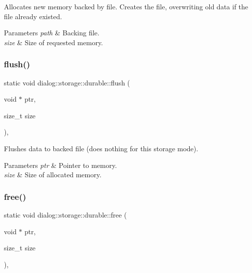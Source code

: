 Allocates new memory backed by file. Creates the file, overwriting old data if the file already existed.


\begin{DoxyParams}{Parameters}
{\em path} & Backing file. \\
\hline
{\em size} & Size of requested memory. \\
\hline
\end{DoxyParams}
\mbox{\label{structdialog_1_1storage_1_1durable_a1ea22279109b5b06d195aadfe5594ef4}} 
\subsubsection{\texorpdfstring{flush()}{flush()}}
{\footnotesize\ttfamily static void dialog\+::storage\+::durable\+::flush (\begin{DoxyParamCaption}\item[{void $\ast$}]{ptr,  }\item[{size\+\_\+t}]{size }\end{DoxyParamCaption})\hspace{0.3cm}{\ttfamily [inline]}, {\ttfamily [static]}}

Flushes data to backed file (does nothing for this storage mode).


\begin{DoxyParams}{Parameters}
{\em ptr} & Pointer to memory. \\
\hline
{\em size} & Size of allocated memory. \\
\hline
\end{DoxyParams}
\mbox{\label{structdialog_1_1storage_1_1durable_a4fe38b9ca53b3cb89d53e5343f813db9}} 
\subsubsection{\texorpdfstring{free()}{free()}}
{\footnotesize\ttfamily static void dialog\+::storage\+::durable\+::free (\begin{DoxyParamCaption}\item[{void $\ast$}]{ptr,  }\item[{size\+\_\+t}]{size }\end{DoxyParamCaption})\hspace{0.3cm}{\ttfamily [inline]}, {\ttfamily [static]}}


